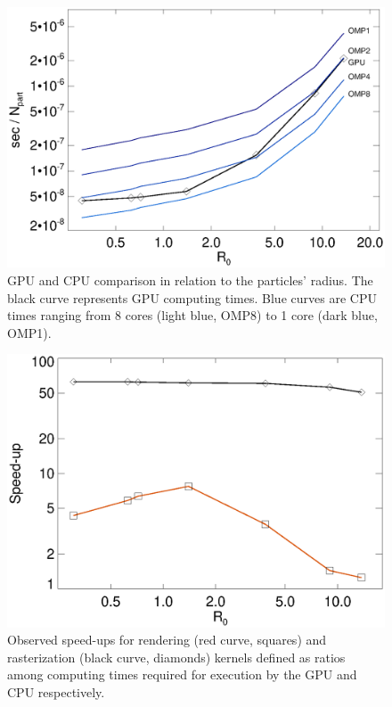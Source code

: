 \documentclass[preprint,5pt]{elsarticle}
\begin{document}
\begin{figure}
\includegraphics[scale=0.5]{scalaompK20-fig7.eps}
\caption{GPU and CPU comparison in relation to the particles' radius. The black curve represents GPU computing times. Blue curves are CPU times ranging from 8 cores (light blue, OMP8) to 1 core (dark blue, OMP1).}
\label{fig:gpucpu}
\end{figure}

\begin{figure}
\includegraphics[scale=0.5]{speedupK20-fig8.eps}
\caption{
Observed speed-ups for rendering (red curve, squares) and rasterization (black curve, diamonds) kernels defined as ratios among computing times required for execution by the GPU and CPU respectively.
}
\label{fig:speedup}
\end{figure}
\end{document}
